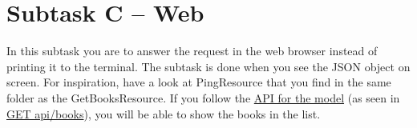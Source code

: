 \section{Subtask C -- Web}\label{subtask-c-web}

In this subtask you are to answer the request in the web browser instead
of printing it to the terminal. The subtask is done when you see the
JSON object on screen. For inspiration, have a look at PingResource that
you find in the same folder as the GetBooksResource. If you follow the
\href{https://htmlpreview.github.io/?https://github.com/tobias-dv-lnu/1dv600-lab/blob/master/api-specification/api-specification.html}{API
for the model} (as seen in
\href{https://htmlpreview.github.io/?https://github.com/tobias-dv-lnu/1dv600-lab/blob/master/api-specification/api-specification.html\#books-get}{GET
api/books})​, you will be able to show the books in the list.

